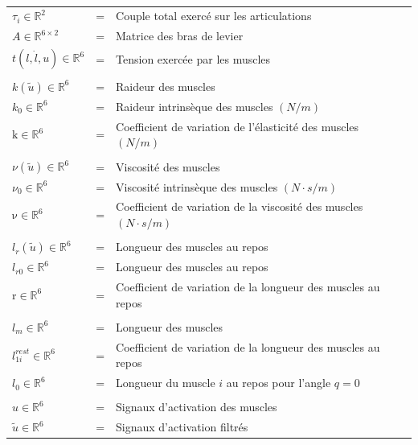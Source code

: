 \documentclass[pdftex,a4paper,11pt]{article}
\numberwithin{equation}{subsection}
\begin{document}
\paragraph{}
\begin{tabular}{lcl}
    $\tau_i \in \mathbb{R}^2$            & = & Couple total exercé sur les articulations \\
    $A \in \mathbb{R}^{6 \times 2}$      & = & Matrice des bras de levier \\
    $t(l, \dot{l}, u) \in \mathbb{R}^6$  & = & Tension exercée par les muscles \\
    \\

    $k(\tilde{u}) \in \mathbb{R}^6$      & = & Raideur des muscles \\ %
    $k_0 \in \mathbb{R}^6$               & = & Raideur intrinsèque des muscles $(N/m)$ \\
    $\mathrm{k} \in \mathbb{R}^6$                 & = & Coefficient de variation de l'élasticité des muscles $(N/m)$ \\
    \\

    $\nu(\tilde{u}) \in \mathbb{R}^6$    & = & Viscosité des muscles \\
    $\nu_0 \in \mathbb{R}^6$             & = & Viscosité intrinsèque des muscles $(N \cdot s/m)$ \\
    $\mathrm{\nu} \in \mathbb{R}^6$               & = & Coefficient de variation de la viscosité des muscles $(N \cdot s/m)$ \\
    \\

    $l_r(\tilde{u}) \in \mathbb{R}^6$    & = & Longueur des muscles au repos \\
    $l_{r0} \in \mathbb{R}^6$            & = & Longueur des muscles au repos \\
    $\mathrm{r} \in \mathbb{R}^6$                 & = & Coefficient de variation de la longueur des muscles au repos \\
    \\

    $l_m \in \mathbb{R}^6$               & = & Longueur des muscles \\
    $l^{rest}_{1i} \in \mathbb{R}^6$     & = & Coefficient de variation de la longueur des muscles au repos \\
    $l_{0} \in \mathbb{R}^6$                  & = & Longueur du muscle $i$ au repos pour l'angle $q = 0$ \\
    \\

    $u \in \mathbb{R}^6$                 & = & Signaux d'activation des muscles \\
    $\tilde{u} \in \mathbb{R}^6$         & = & Signaux d'activation filtrés \\
\end{tabular}
\end{document}
